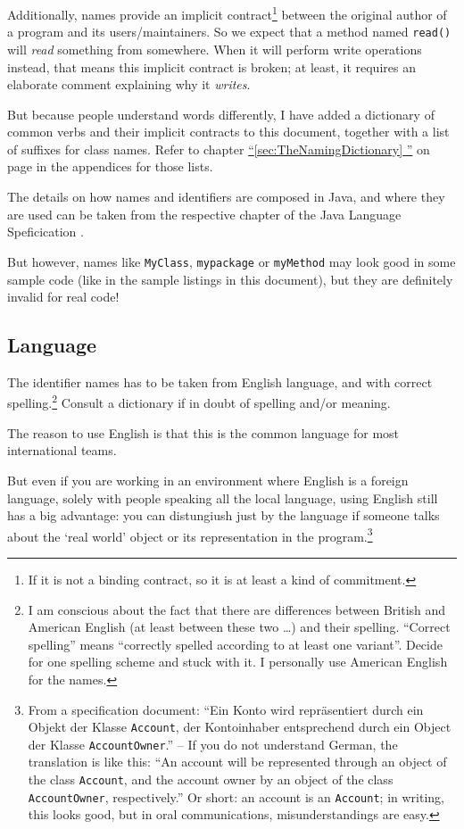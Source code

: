 \documentclass[12pt,a4paper,titlepage, parskip=half, headsepline, footsepline, cleardoubleplain]{scrbook}
\newcommand*{\tqfullvref}[1]{\hyperref[{#1}]{“\ref*{#1} \nameref*{#1}”} on page \pageref{#1}}
\begin{document}
Additionally, names provide an implicit contract\footnote{If it is not a binding contract, so it is at least a kind of commitment.} between the original author of a program and its users/maintainers. So we expect that a method named \lstinline|read()| will \textit{read} something from somewhere. When it will perform write operations instead, that means this implicit contract is broken; at least, it requires an elaborate comment explaining why it \textit{writes}.

But because people understand words differently, I have added a dictionary of common verbs and their implicit contracts to this document, together with a list of suffixes for class names. Refer to chapter \tqfullvref{sec:TheNamingDictionary} in the appendices for those lists.

The details on how names and identifiers are composed in Java, and where they are used can be taken from the respective chapter of the Java Language Speficication \autocite{ORACLE_DOC_LANGUAGE_SPECIFICATION:NamesAndIdentifiers}.

But however, names like \lstinline|MyClass|, \lstinline|mypackage| or \lstinline|myMethod| may look good in some sample code (like in the sample listings in this document), but they are definitely invalid for real code!

\subsection{Language}
The identifier names has to be taken from English language, and with correct spelling.\footnote{I am conscious about the fact that there are differences between British and American English (at least between these two …) and their spelling. “Correct spelling” means “correctly spelled according to at least one variant”. Decide for one spelling scheme and stuck with it. I personally use American English for the names.} Consult a dictionary if in doubt of spelling and/or meaning.

The reason to use English is that this is the common language for most international teams.

But even if you are working in an environment where English is a foreign language, solely with people speaking all the local language, using English still has a big advantage: you can distungiush just by the language if someone talks about the ‘real world’ object or its representation in the program.\footnote{From a specification document: “Ein Konto wird repräsentiert durch ein Objekt der Klasse \lstinline|Account|, der Kontoinhaber entsprechend durch ein Object der Klasse \lstinline|AccountOwner|.” – If you do not understand German, the translation is like this: “An account will be represented through an object of the class \lstinline|Account|, and the account owner by an object of the class \lstinline|AccountOwner|, respectively.” Or short: an account is an \lstinline|Account|; in writing, this looks good, but in oral communications, misunderstandings are easy. }
\end{document}
